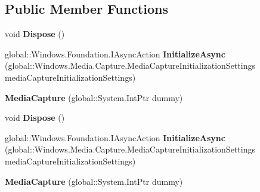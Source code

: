 \subsection*{Public Member Functions}
\begin{DoxyCompactItemize}
\item 
\mbox{\label{class_windows_1_1_media_1_1_capture_1_1_media_capture_a11b0e769ad1d6fc6ab7fa7063257316c}} 
void {\bfseries Dispose} ()
\item 
\mbox{\label{class_windows_1_1_media_1_1_capture_1_1_media_capture_abb4da1ecbe4e67ab5200a83e3f5caf76}} 
global\+::\+Windows.\+Foundation.\+I\+Async\+Action {\bfseries Initialize\+Async} (global\+::\+Windows.\+Media.\+Capture.\+Media\+Capture\+Initialization\+Settings media\+Capture\+Initialization\+Settings)
\item 
\mbox{\label{class_windows_1_1_media_1_1_capture_1_1_media_capture_ad8d682747c4f4cc0015b3c2023307b3d}} 
{\bfseries Media\+Capture} (global\+::\+System.\+Int\+Ptr dummy)
\item 
\mbox{\label{class_windows_1_1_media_1_1_capture_1_1_media_capture_a11b0e769ad1d6fc6ab7fa7063257316c}} 
void {\bfseries Dispose} ()
\item 
\mbox{\label{class_windows_1_1_media_1_1_capture_1_1_media_capture_abb4da1ecbe4e67ab5200a83e3f5caf76}} 
global\+::\+Windows.\+Foundation.\+I\+Async\+Action {\bfseries Initialize\+Async} (global\+::\+Windows.\+Media.\+Capture.\+Media\+Capture\+Initialization\+Settings media\+Capture\+Initialization\+Settings)
\item 
\mbox{\label{class_windows_1_1_media_1_1_capture_1_1_media_capture_ad8d682747c4f4cc0015b3c2023307b3d}} 
{\bfseries Media\+Capture} (global\+::\+System.\+Int\+Ptr dummy)
\item 
\mbox{\label{class_windows_1_1_media_1_1_capture_1_1_media_capture_a11b0e769ad1d6fc6ab7fa7063257316c}} 

\end{DoxyCompactItemize}
